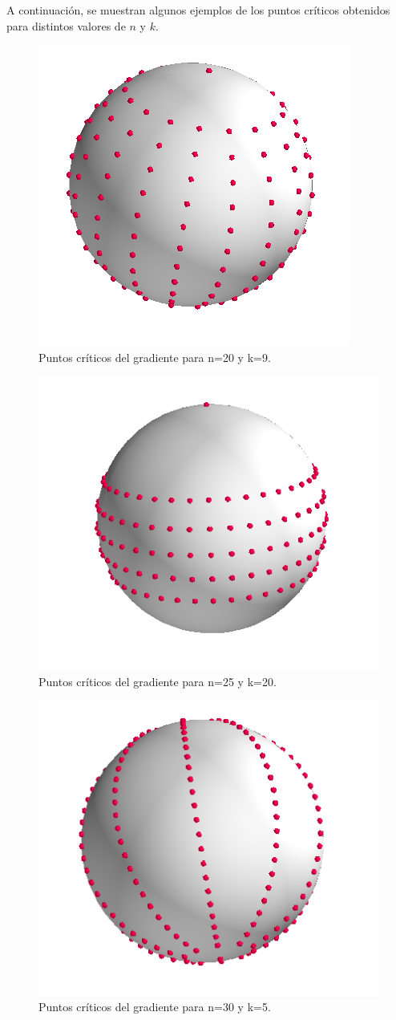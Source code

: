 A continuación, se muestran algunos ejemplos de los puntos críticos obtenidos para distintos valores de $n$ y $k$.
\begin{figure}[H]
	\centering
	\includegraphics[scale=0.5]{img/gradient_20_9.png}
	\caption{Puntos críticos del gradiente para n=20 y k=9.}
\end{figure}

\begin{figure}[H]
	\centering
	\includegraphics[scale=0.5]{img/gradient_25_5.png}
	\caption{Puntos críticos del gradiente para n=25 y k=20.}
\end{figure}

\begin{figure}[H]
	\centering
	\includegraphics[scale=0.5]{img/gradient_30_5.png}
	\caption{Puntos críticos del gradiente para n=30 y k=5.}
\end{figure}
